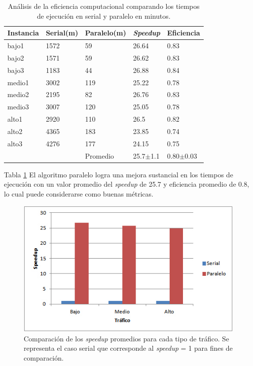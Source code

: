 \begin{table}[H]
	\renewcommand{\arraystretch}{1.2}
	\caption[Análisis de la eficiencia computacional.]{Análisis de la eficiencia computacional comparando los tiempos de ejecución en serial y paralelo en minutos. }
	\label{table:analisis_speedup}
	\centering
	\begin{tabular}{p{2.5cm}p{2.5cm}p{2.5cm}p{2.5cm}p{2.5cm} }
		\hline
		
		Instancia& 
		Serial(m) & 
		Paralelo(m) &
		\emph{Speedup} &
		Eficiencia
		\\ 
		\hline
		bajo1  & 1572 & 59 & 26.64 & 0.83\\
		bajo2  & 1571 & 59 & 26.62 & 0.83\\
		bajo3  & 1183 & 44 & 26.88 & 0.84\\
		
		medio1  & 3002 & 119 & 25.22 & 0.78\\
		medio2  & 2195 & 82 & 26.76 & 0.83\\
		medio3  & 3007 & 120 & 25.05 & 0.78\\
		
		alto1  & 2920 & 110 & 26.5 & 0.82\\
		alto2  & 4365 & 183 & 23.85 & 0.74\\
		alto3  & 4276 & 177 & 24.15 & 0.75\\
		\hline
		  &  & Promedio & 25.7$\pm$1.1 & 0.80$\pm$0.03\\
		
		\hline
	\end{tabular}
\end{table}

 Tabla \ref{table:analisis_speedup} El algoritmo paralelo logra una mejora sustancial en los tiempos de ejecución con un valor promedio del \emph{speedup} de 25.7  y  eficiencia promedio de 0.8, lo cual puede considerarse como buenas métricas.

\begin{figure}[H]
	\centering
	\includegraphics[width=0.8\linewidth]{Figures/speedup1}
	\caption[Comparación de los \emph{speedup} promedios para cada tipo de tráfico.]{Comparación de los \emph{speedup} promedios para cada tipo de tráfico. Se representa el caso serial que corresponde al \emph{speedup} = 1 para fines de comparación.}
	\label{fig:speedup1}
\end{figure}

